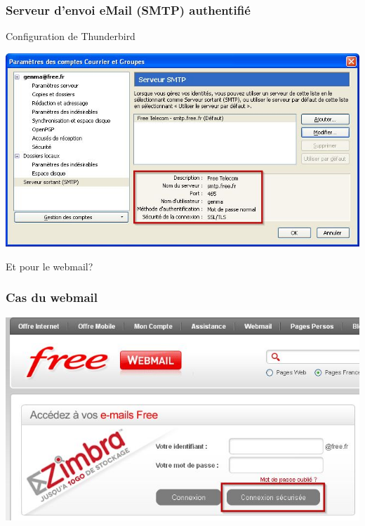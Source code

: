 \documentclass{beamer}
\begin{document}
\begin{frame}
\frametitle{Serveur d'envoi eMail (SMTP) authentifié}

\begin{block}{Configuration de Thunderbird}
\end{block}
\begin{center}
\includegraphics[scale=0.5] {./images/Thunderbird02.jpg} 
\end{center}

\end{frame}


\begin{frame}
\begin{center}
\Huge{Et pour le webmail?}
\end{center}
\end{frame}


\begin{frame}
\frametitle{Cas du webmail}

\begin{center}
\includegraphics[scale=0.5] {./images/Webmail01.jpg}
\end{center}
\end{frame}
\end{document}
